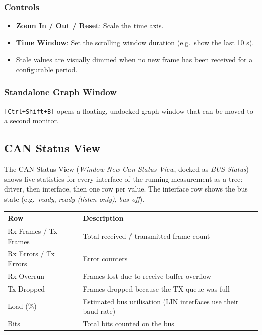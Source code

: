\documentclass[a4paper,11pt]{article}
\newcommand{\key}[1]{\texttt{\small[#1]}}
\newcommand{\menu}[1]{\textit{#1}}
\newcommand{\ui}[1]{\textbf{#1}}
\begin{document}
\subsubsection{Controls}

\begin{itemize}
  \item \ui{Zoom In / Out / Reset}: Scale the time axis.
  \item \ui{Time Window}: Set the scrolling window duration (e.g.\ show the last 10 s).
  \item Stale values are visually dimmed when no new frame has been received for a
        configurable period.
\end{itemize}

\subsubsection{Standalone Graph Window}

\key{Ctrl+Shift+B} opens a floating, undocked graph window that can be moved to a
second monitor.

\subsection{CAN Status View}

The CAN Status View (\menu{Window \textrightarrow{} New \textrightarrow{} Can Status View},
docked as \textit{BUS Status}) shows live statistics for every interface of the
running measurement as a tree: driver, then interface, then one row per value.
The interface row shows the bus state (e.g.\ \textit{ready},
\textit{ready (listen only)}, \textit{bus off}).

\begin{table}[h]
  \centering
  \begin{tabularx}{\textwidth}{lX}
    \toprule
    \textbf{Row} & \textbf{Description} \\
    \midrule
    Rx Frames / Tx Frames & Total received / transmitted frame count \\
    Rx Errors / Tx Errors & Error counters \\
    Rx Overrun            & Frames lost due to receive buffer overflow \\
    Tx Dropped            & Frames dropped because the TX queue was full \\
    Load (\%)             & Estimated bus utilisation (LIN interfaces use their
                            baud rate) \\
    Bits                  & Total bits counted on the bus \\
    \bottomrule
  \end{tabularx}
\end{table}
\end{document}
